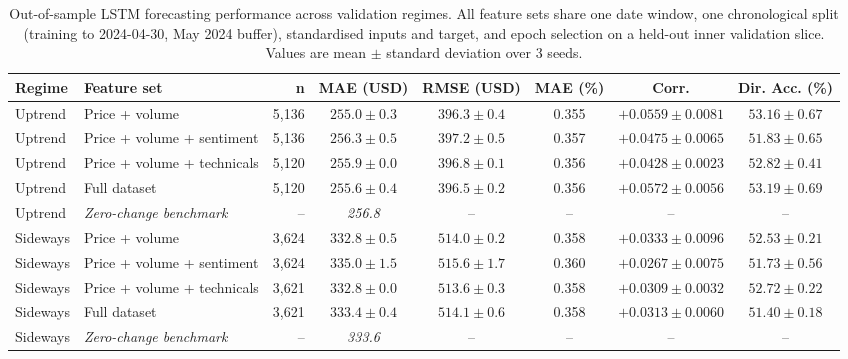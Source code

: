 \begin{table}[H]
\footnotesize
\centering
\begin{threeparttable}
\caption{Out-of-sample LSTM forecasting performance across validation regimes. All feature sets share one date window, one chronological split (training to 2024-04-30, May 2024 buffer), standardised inputs and target, and epoch selection on a held-out inner validation slice. Values are mean $\pm$ standard deviation over 3 seeds.}
\label{tab:lstm_forecasting_performance_results}
\renewcommand{\arraystretch}{1.1}
\setlength{\tabcolsep}{4pt}
\begin{tabular}{llrccccc}
\toprule
\textbf{Regime} & \textbf{Feature set} & \textbf{n} & \textbf{MAE (USD)} & \textbf{RMSE (USD)} & \textbf{MAE (\%)} & \textbf{Corr.} & \textbf{Dir. Acc. (\%)} \\
\midrule
Uptrend & Price + volume & 5,136 & $255.0 \pm 0.3$ & $396.3 \pm 0.4$ & 0.355 & $+0.0559 \pm 0.0081$ & $53.16 \pm 0.67$ \\
Uptrend & Price + volume + sentiment & 5,136 & $256.3 \pm 0.5$ & $397.2 \pm 0.5$ & 0.357 & $+0.0475 \pm 0.0065$ & $51.83 \pm 0.65$ \\
Uptrend & Price + volume + technicals & 5,120 & $255.9 \pm 0.0$ & $396.8 \pm 0.1$ & 0.356 & $+0.0428 \pm 0.0023$ & $52.82 \pm 0.41$ \\
Uptrend & Full dataset & 5,120 & $255.6 \pm 0.4$ & $396.5 \pm 0.2$ & 0.356 & $+0.0572 \pm 0.0056$ & $53.19 \pm 0.69$ \\
\addlinespace Uptrend & \textit{Zero-change benchmark} & -- & \textit{256.8} & -- & -- & -- & -- \\
\midrule
Sideways & Price + volume & 3,624 & $332.8 \pm 0.5$ & $514.0 \pm 0.2$ & 0.358 & $+0.0333 \pm 0.0096$ & $52.53 \pm 0.21$ \\
Sideways & Price + volume + sentiment & 3,624 & $335.0 \pm 1.5$ & $515.6 \pm 1.7$ & 0.360 & $+0.0267 \pm 0.0075$ & $51.73 \pm 0.56$ \\
Sideways & Price + volume + technicals & 3,621 & $332.8 \pm 0.0$ & $513.6 \pm 0.3$ & 0.358 & $+0.0309 \pm 0.0032$ & $52.72 \pm 0.22$ \\
Sideways & Full dataset & 3,621 & $333.4 \pm 0.4$ & $514.1 \pm 0.6$ & 0.358 & $+0.0313 \pm 0.0060$ & $51.40 \pm 0.18$ \\
\addlinespace Sideways & \textit{Zero-change benchmark} & -- & \textit{333.6} & -- & -- & -- & -- \\
\bottomrule
\end{tabular}
\begin{tablenotes}[flushleft]

\end{tablenotes}
\end{threeparttable}
\end{table}
